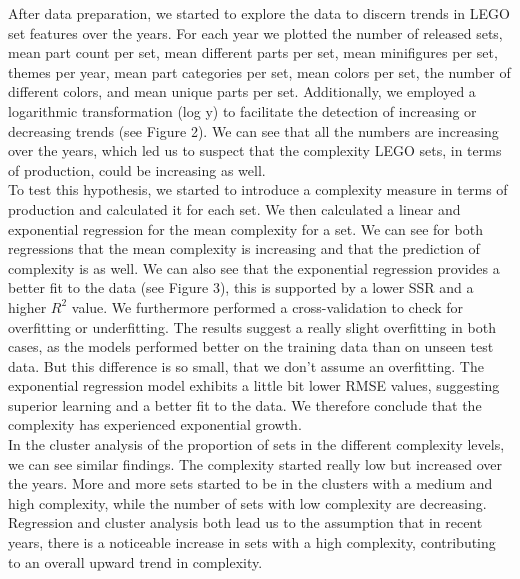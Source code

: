 \documentclass{article}
\theoremstyle{plain}
\theoremstyle{definition}
\theoremstyle{remark}
\begin{document}
After data preparation, we started to explore the data to discern trends in LEGO set features over the years. For each year we plotted the number of released sets, mean part count per set, mean different parts per set, mean minifigures per set, themes per year, mean part categories per set, mean colors per set, the number of different colors, and mean unique parts per set. Additionally, we employed a logarithmic transformation (log y) to facilitate the detection of increasing or decreasing trends (see Figure 2). We can see that all the numbers are increasing over the years, which led us to suspect that the complexity LEGO sets, in terms of production, could be increasing as well. \\
To test this hypothesis, we started to introduce a complexity measure in terms of production and calculated it for each set. We then calculated a linear and exponential regression for the mean complexity for a set. We can see for both regressions that the mean complexity is increasing and that the prediction of complexity is as well. We can also see that the exponential regression provides a better fit to the data (see Figure 3), this is supported by a lower SSR and a higher $R^2$ value. We furthermore performed a cross-validation to check for overfitting or underfitting. The results suggest a really slight overfitting in both cases, as the models performed better on the training data than on unseen test data. But this difference is so small, that we don't assume an overfitting. The exponential regression model exhibits a little bit lower RMSE values, suggesting superior learning and a better fit to the data. We therefore conclude that the complexity has experienced exponential growth. \\
In the cluster analysis of the proportion of sets in the different complexity levels, we can see similar findings. The complexity started really low but increased over the years. More and more sets started to be in the clusters with a medium and high complexity, while the number of sets with low complexity are decreasing. 
Regression and cluster analysis both lead us to the assumption that in recent years, there is a noticeable increase in sets with a high complexity, contributing to an overall upward trend in complexity.\\
\end{document}
